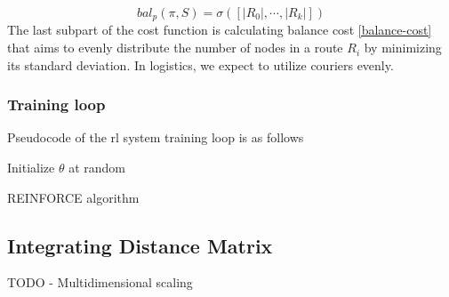         \begin{equation}\label{balance-cost}
            bal_p(\pi, S) = \sigma([|R_0|, \cdots, |R_k|])
        \end{equation}
        The last subpart of the cost function is calculating balance cost \ref{balance-cost} that aims to evenly distribute the number of nodes in a route $R_i$ by minimizing its standard deviation. In logistics, we expect to utilize couriers evenly.
        
        \subsubsection{Training loop}\label{vrptw-loop}
        
        Pseudocode of the \gls{rl} system training loop is as follows
        
        \begin{algorithm}[H]
            
            Initialize $\theta$ at random\;
         \caption{REINFORCE algorithm}
        \end{algorithm}
        
    
    \subsection{Integrating Distance Matrix}
    TODO - Multidimensional scaling
